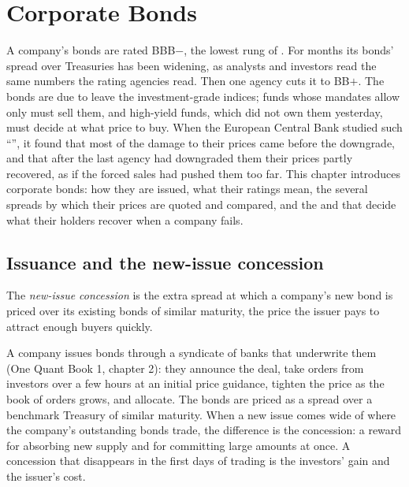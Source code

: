 \chapter{Corporate Bonds}\label{ch:m2:corporate-bonds}

A company's bonds are rated BBB$-$, the lowest rung of . For
months its bonds' spread over Treasuries has been widening, as analysts and
investors read the same numbers the rating agencies read. Then one agency cuts
it to BB$+$. The bonds are due to leave the investment-grade indices; funds whose
mandates allow only  must sell them, and high-yield funds, which did not own them yesterday, must decide at what price
to buy. When the European Central Bank studied such ``'', it found
that most of the damage to their prices came before the downgrade, and that
after the last agency had downgraded them their prices partly recovered, as if
the forced sales had pushed them too far. This chapter introduces corporate
bonds: how they are issued, what their ratings mean, the several spreads by
which their prices are quoted and compared, and the  and  that
decide what their holders recover when a company fails.

\section{Issuance and the new-issue concession}

\begin{definition}\label{def:m2:corporate-bonds:nic}
The \emph{new-issue concession} is the extra spread
at which a company's new bond is priced over its existing bonds of similar
maturity, the price the issuer pays to attract enough buyers quickly.
\end{definition}

A company issues bonds through a syndicate of banks that underwrite them (One
Quant Book 1, chapter 2): they announce the deal, take orders from investors over a
few hours at an initial price guidance, tighten the price as the book of orders
grows, and allocate. The bonds are priced as a spread over a benchmark Treasury of
similar maturity. When a new issue comes wide of where the company's outstanding
bonds trade, the difference is the concession: a reward for absorbing new supply
and for committing large amounts at once. A concession that disappears in the first
days of trading is the investors' gain and the issuer's cost.

